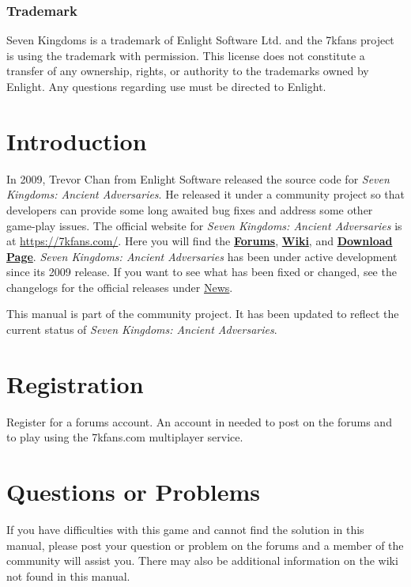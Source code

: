 \documentclass[openany,a4paper,12pt]{book}
\begin{document}
\subsubsection{Trademark}

Seven Kingdoms is a trademark of Enlight Software Ltd. and the 7kfans project is using the trademark with permission. This license does not constitute a transfer of any ownership, rights, or authority to the trademarks owned by Enlight. Any questions regarding use must be directed to Enlight.

\clearpage

\section{Introduction}

In 2009, Trevor Chan from Enlight Software released the source code for \textit{Seven Kingdoms: Ancient Adversaries}. He released it under a community project so that developers can provide some long awaited bug fixes and address some other game-play issues. The official website for \textit{Seven Kingdoms: Ancient Adversaries} is at \href{<https://7kfans.com/>}{https://7kfans.com/}. Here you will find the \href{<https://www.7kfans.com/forums/>}{\textbf{Forums}}, \href{<https://www.7kfans.com/wiki/index.php/Main_Page>}{\textbf{Wiki}}, and \href{<https://www.7kfans.com/wiki/index.php/Download>}{\textbf{Download Page}}. \textit{Seven Kingdoms: Ancient Adversaries} has been under active development since its 2009 release. If you want to see what has been fixed or changed, see the changelogs for the official releases under \href{<https://7kfans.com/>}{News}. 

This manual is part of the community project. It has been updated to reflect the current status of \textit{Seven Kingdoms: Ancient Adversaries}.

\section{Registration}

Register for a forums account. An account in needed to post on the forums and to play using the 7kfans.com multiplayer service.

\section{Questions or Problems}

If you have difficulties with this game and cannot find the solution in this manual, please post your question or problem on the forums and a member of the community will assist you. There may also be additional information on the wiki not found in this manual.
\end{document}
